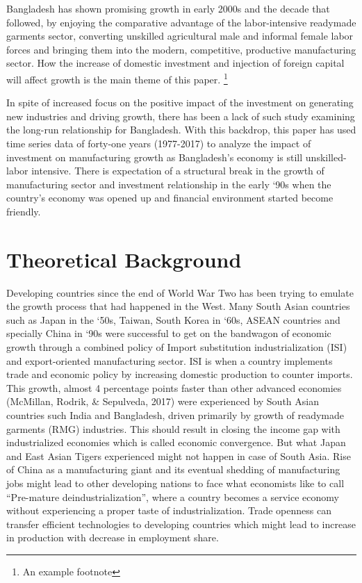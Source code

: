\documentclass[11pt,a4paper]{article}
\begin{document}
Bangladesh has shown promising growth in early 2000s and the decade that followed, by enjoying the comparative advantage of the labor-intensive readymade garments sector, converting unskilled agricultural male and informal female labor forces and bringing them into the modern, competitive, productive manufacturing sector. How the increase of domestic investment and injection of foreign capital will affect growth is the main theme of this paper. \footnote{An example footnote}

In spite of increased focus on the positive impact of the investment on generating new industries and driving growth, there has been a lack of such study examining the long-run relationship for Bangladesh. With this backdrop, this paper has used time series data of forty-one years (1977-2017) to analyze the impact of investment on manufacturing growth as Bangladesh’s economy is still unskilled-labor intensive. There is expectation of a structural break in the growth of manufacturing sector and investment relationship in the early ‘90s when the country’s economy was opened up and financial environment started become friendly.

\section{Theoretical Background}

\normalsize Developing countries since the end of World War Two has been trying to emulate the growth process that had happened in the West. Many South Asian countries such as Japan in the ‘50s, Taiwan, South Korea in ‘60s, ASEAN countries and specially China in ‘90s were successful to get on the bandwagon of economic growth through a combined policy of Import substitution industrialization (ISI) and export-oriented manufacturing sector. ISI is when a country implements trade and economic policy by increasing domestic production to counter imports.  This growth, almost 4 percentage points faster than other advanced economies (McMillan, Rodrik, \& Sepulveda, 2017) were experienced by South Asian countries such India and Bangladesh, driven primarily by growth of readymade garments (RMG) industries. This should result in closing the income gap with industrialized economies which is called economic convergence. But what Japan and East Asian Tigers experienced might not happen in case of South Asia. Rise of China as a manufacturing giant and its eventual shedding of manufacturing jobs might lead to other developing nations to face what economists like to call “Pre-mature deindustrialization”, where a country becomes a service economy without experiencing a proper taste of industrialization. Trade openness can transfer efficient technologies to developing countries which might lead to increase in production with decrease in employment share. 
\end{document}
